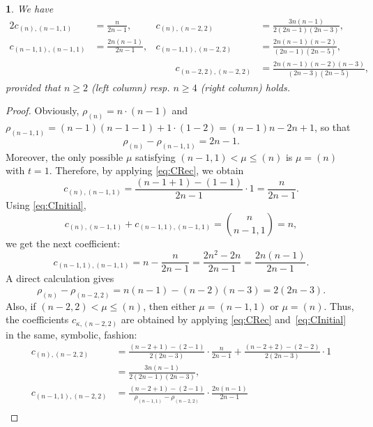 \documentclass[10pt,oneside,american]{amsart}
\numberwithin{equation}{section}
\numberwithin{figure}{section}
\theoremstyle{definition}
\theoremstyle{remark}
\theoremstyle{plain}
\theoremstyle{definition}
\theoremstyle{plain}
\newtheorem{thm}{\protect\theoremname}[section]
\providecommand{\theoremname}{Theorem}
\begin{document}
\begin{thm}
\label{thm:fam1}
We have
\begin{alignat*}{2}
  c_{(n),(n-1,1)} &= \frac{n}{2n-1}, &
  c_{(n),(n-2,2)} &= \frac{3n(n-1)}{2(2n-1)(2n-3)}, \\
  c_{(n-1,1),(n-1,1)} &= \frac{2n(n-1)}{2n-1}, &
  c_{(n-1,1),(n-2,2)} &= \frac{2n(n-1)(n-2)}{(2n-1)(2n-5)}, \\
  &&\qquad
  c_{(n-2,2),(n-2,2)} &= \frac{2n(n-1)(n-2)(n-3)}{(2n-3)(2n-5)},
\end{alignat*}
provided that $n\geq2$ (left column) resp. $n\geq4$ (right column) holds.
\end{thm}
\begin{proof}
Obviously, $\rho_{\left(n\right)}=n\cdot\left(n-1\right)$ and
$\rho_{\left(n-1,1\right)}=\left(n-1\right)\left(n-1-1\right)+1\cdot\left(1-2\right)=\left(n-1\right)n-2n+1$,
so that 
\[
  \rho_{\left(n\right)}-\rho_{\left(n-1,1\right)}=2n-1.
\]
Moreover, the only possible $\mu$ satisfying $\left(n-1,1\right)<\mu\leq\left(n\right)$
is $\mu=\left(n\right)$ with $t=1$. Therefore,  by applying \eqref{eq:CRec}, we obtain
\[
  c_{\left(n\right),\left(n-1,1\right)}=\frac{\left(n-1+1\right)-\left(1-1\right)}{2n-1}\cdot1=\frac{n}{2n-1}.
\]
Using \eqref{eq:CInitial},
\[
  c_{\left(n\right),\left(n-1,1\right)}+c_{\left(n-1,1\right),\left(n-1,1\right)}=\binom{n}{n-1,1}=n,
\]
we get the next coefficient:
\[
  c_{\left(n-1,1\right),\left(n-1,1\right)}=n-\frac{n}{2n-1}=\frac{2n^{2}-2n}{2n-1}=\frac{2n\left(n-1\right)}{2n-1}.
\]
A direct calculation gives 
\[
  \rho_{\left(n\right)}-\rho_{\left(n-2,2\right)} =
  n\left(n-1\right)-\left(n-2\right)\left(n-3\right) =
  2\left(2n-3\right).
\]
Also, if $\left(n-2,2\right)<\mu\leq\left(n\right)$, then either
$\mu=\left(n-1,1\right)$ or $\mu=\left(n\right)$. Thus, the coefficients
$c_{\kappa,(n-2,2)}$ are obtained by applying \eqref{eq:CRec} and~\eqref{eq:CInitial}
in the same, symbolic, fashion:
\begin{align*}
  c_{\left(n\right),\left(n-2,2\right)} 
  &= \frac{\left(n-2+1\right)-\left(2-1\right)}{2\left(2n-3\right)}\cdot\frac{n}{2n-1}+\frac{\left(n-2+2\right)-\left(2-2\right)}{2\left(2n-3\right)}\cdot1\\
  &= \frac{3n\left(n-1\right)}{2\left(2n-1\right)\left(2n-3\right)},\\
  c_{\left(n-1,1\right),\left(n-2,2\right)}
  &= \frac{\left(n-2+1\right)-\left(2-1\right)}{\rho_{\left(n-1,1\right)}-\rho_{\left(n-2,2\right)}}\cdot\frac{2n\left(n-1\right)}{2n-1}\\

\end{align*}
\end{proof}
\end{document}
